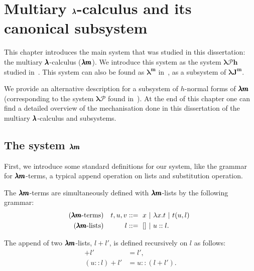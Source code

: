 \chapter{Multiary $\pmb{\lambda}$-calculus and its canonical subsystem}
\label{c:multiary}

This chapter introduces the main system that was studied in this dissertation: the multiary $\pmb{\lambda}$-calculus ($\pmb{\lambda m}$).
We introduce this system as the system $\pmb{\lambda \mathcal{P}h}$ studied in~\cite[Chapter~3]{JCES2002}.
This system can also be found as $\pmb{\lambda^m}$ in~\cite[Section~3]{JCESLuis}, as a subsystem of $\pmb{\lambda J^m}$.

We provide an alternative description for a subsystem of $h$-normal forms of $\pmb{\lambda m}$ (corresponding to the system $\pmb{\lambda \mathcal{P}}$ found in~\cite[Chapter~3]{JCES2002}).
At the end of this chapter one can find a detailed overview of the mechanisation done in this dissertation of the multiary $\pmb{\lambda}$-calculus and subsystems.

\section{The system $\pmb{\lambda m}$}

First, we introduce some standard definitions for our system, like the grammar for $\pmb{\lambda m}$-terms, a typical append operation on lists and substitution operation.

\begin{definition}
  The $\pmb{\lambda m}$-terms are simultaneously defined with $\pmb{\lambda m}$-lists by the following grammar:  
  \begin{align*} 
    (\pmb{\lambda m} \text{-terms}) && t, u, v &::= \ x \ | \ \lambda x . t \ | \ t(u, l) \ \\
    (\pmb{\lambda m} \text{-lists}) && l       &::= \ []\  | \ u :: l.
  \end{align*}
\end{definition}

\begin{definition}[Append]
  The append of two $\pmb{\lambda m}$-lists, $l + l'$, is defined recursively on $l$ as follows:
  \begin{align*}
    [] + l'     &= l', \\
    (u::l) + l' &= u::(l + l').
  \end{align*}
\end{definition}

